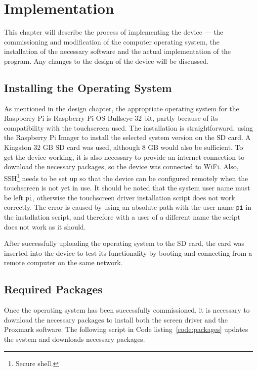\chapter{Implementation}

This chapter will describe the process of implementing the device --- the commissioning and modification of the computer operating system, the installation of the necessary software and the actual implementation of the program. Any changes to the design of the device will be discussed.

\section{Installing the Operating System}

As mentioned in the design chapter, the appropriate operating system for the Raspberry Pi is Raspberry Pi OS Bullseye 32 bit, partly because of its compatibility with the touchscreen used. The installation is straightforward, using the Raspberry Pi Imager to install the selected system version on the SD card. A Kingston 32 GB SD card was used, although 8 GB would also be sufficient. To get the device working, it is also necessary to provide an internet connection to download the necessary packages, so the device was connected to WiFi. Also, SSH\footnote{Secure shell.} needs to be set up so that the device can be configured remotely when the touchscreen is not yet in use. It should be noted that the system user name must be left \texttt{pi}, otherwise the touchscreen driver installation script does not work correctly. The error is caused by using an absolute path with the user name \texttt{pi} in the installation script, and therefore with a user of a different name the script does not work as it should.   

After successfully uploading the operating system to the SD card, the card was inserted into the device to test its functionality by booting and connecting from a remote computer on the same network.  

\section{Required Packages}

Once the operating system has been successfully commissioned, it is necessary to download the necessary packages to install both the screen driver and the Proxmark software. The following script in Code listing~\ref{code:packages} updates the system and downloads necessary packages.

